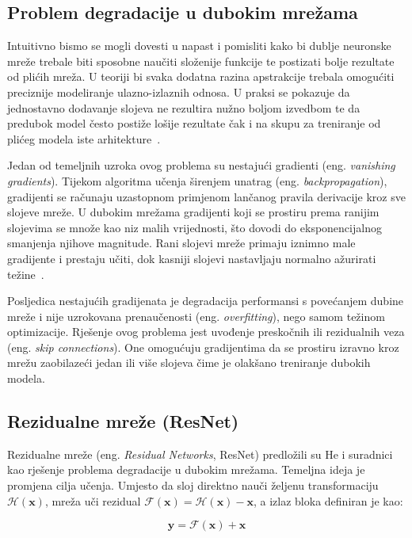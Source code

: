 \documentclass[diplomskirad]{fer}
\begin{document}
\subsection{Problem degradacije u dubokim mrežama}

Intuitivno bismo se mogli dovesti u napast i pomisliti kako bi dublje neuronske mreže trebale biti sposobne naučiti složenije funkcije te postizati bolje rezultate od plićih mreža. U teoriji bi svaka dodatna razina apstrakcije trebala omogućiti preciznije modeliranje ulazno-izlaznih odnosa. U praksi se pokazuje da jednostavno dodavanje slojeva ne rezultira nužno boljom izvedbom te da predubok model često postiže lošije rezultate čak i na skupu za treniranje od plićeg modela iste arhitekture~\cite{goodfellow2016deep}.

Jedan od temeljnih uzroka ovog problema su nestajući gradienti (eng. \textit{vanishing gradients}). Tijekom algoritma učenja širenjem unatrag (eng. \textit{backpropagation}), gradijenti se računaju uzastopnom primjenom lančanog pravila derivacije kroz sve slojeve mreže. U dubokim mrežama gradijenti koji se prostiru prema ranijim slojevima se množe kao niz malih vrijednosti, što dovodi do eksponencijalnog smanjenja njihove magnitude. Rani slojevi mreže primaju iznimno male gradijente i prestaju učiti, dok kasniji slojevi nastavljaju normalno ažurirati težine~\cite{goodfellow2016deep}.

Posljedica nestajućih gradijenata je degradacija performansi s povećanjem dubine mreže i nije uzrokovana prenaučenosti (eng. \textit{overfitting}), nego samom težinom optimizacije. Rješenje ovog problema jest uvođenje preskočnih ili rezidualnih veza (eng. \textit{skip connections}). One omogućuju gradijentima da se prostiru izravno kroz mrežu zaobilazeći jedan ili više slojeva čime je olakšano treniranje dubokih modela.

\subsection{Rezidualne mreže (ResNet)}

Rezidualne mreže (eng. \textit{Residual Networks}, ResNet) predložili su He i suradnici~\cite{he2016resnet} kao rješenje problema degradacije u dubokim mrežama. Temeljna ideja je promjena cilja učenja. Umjesto da sloj direktno nauči željenu transformaciju $\mathcal{H}(\mathbf{x})$, mreža uči rezidual $\mathcal{F}(\mathbf{x}) = \mathcal{H}(\mathbf{x}) - \mathbf{x}$, a izlaz bloka definiran je kao:

\begin{equation}
	\mathbf{y} = \mathcal{F}(\mathbf{x}) + \mathbf{x}
\end{equation}
\end{document}
